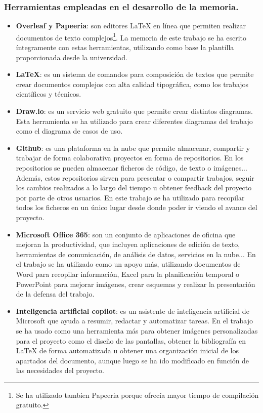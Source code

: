     \subsubsection{Herramientas empleadas en el desarrollo de la memoria.}
    \begin{itemize}
        \item \textbf{Overleaf y Papeeria}: son editores LaTeX en línea que permiten realizar documentos de texto complejos\footnote{Se ha utilizado tambien Papeeria porque ofrecía mayor tiempo de compilación gratuito.}. La memoria de este trabajo se ha escrito íntegramente con estas herramientas, utilizando como base la plantilla proporcionada desde la universidad. \cite{Overleaf, Papeeria}
                
        \item \textbf{LaTeX}: es un sistema de comandos para composición de textos que permite crear documentos complejos con alta calidad tipográfica, como los trabajos científicos y técnicos.

        
        \item \textbf{Draw.io}: es un servicio web gratuito que permite crear distintos diagramas. Esta herramienta se ha utilizado para crear diferentes diagramas del trabajo como el diagrama de casos de uso. \cite{Diagrams.net}
        
        \item \textbf{Github}: es una plataforma en la nube que permite almacenar, compartir y trabajar de forma colaborativa proyectos en forma de repositorios. En los repositorios se pueden almacenar ficheros de código, de texto o imágenes... Además, estos repositorios sirven para presentar o compartir trabajos, seguir los cambios realizados a lo largo del tiempo u obtener feedback del proyecto por parte de otros usuarios. En este trabajo se ha utilizado para recopilar todos los ficheros en un único lugar desde donde poder ir viendo el avance del proyecto.\cite{gitHub}
        
        \item \textbf{Microsoft Office 365}: son un conjunto de aplicaciones de oficina que mejoran la productividad, que incluyen aplicaciones de edición de texto, herramientas de comunicación, de análisis de datos, servicios en la nube... En el trabajo se ha utilizado como un apoyo más, utilizando documentos de Word para recopilar información, Excel para la planificación temporal o PowerPoint para mejorar imágenes, crear esquemas y realizar la presentación de la defensa del trabajo.\cite{microsoft365} 

        
        \item \textbf{Inteligencia artificial copilot}: es un asistente de inteligencia artificial de Microsoft que ayuda a resumir, redactar y automatizar tareas. En el trabajo se ha usado como una herramienta más para obtener imágenes personalizadas para el proyecto como el diseño de las pantallas, obtener la bibliografía en LaTeX de forma automatizada u obtener una organización inicial de los apartados del documento, aunque luego se ha ido modificado en función de las necesidades del proyecto.\cite{copilot2025}
        
    \end{itemize}

